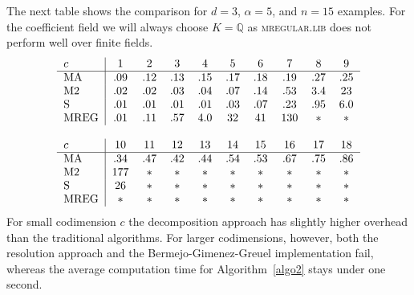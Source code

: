 \documentclass[11pt,a4paper]{amsart}%
\theoremstyle{definition}
\theoremstyle{remark}
\numberwithin{equation}{section}
\theoremstyle{plain}
\begin{document}
The next table shows the comparison for $d=3$, $\alpha=5$, and $n=15$
examples. For the coefficient field we will always choose $K=\mathbb{Q}$ as
\textsc{mregular.lib} does not perform well over finite fields.
\[%
\begin{tabular}
[c]{lccccccccc}%
$c$ & \multicolumn{1}{|c}{$1$} & $2$ & $3$ & $4$ & $5$ & $6$ & $7$ & $8$ &
$9$\\\hline
MA & \multicolumn{1}{|c}{$.09$} & $.12$ & $.13$ & $.15$ & $.17$ & $.18$ &
$.19$ & $.27$ & $.25$\\
M2 & \multicolumn{1}{|c}{$.02$} & $.02$ & $.03$ & $.04$ & $.07$ & $.14$ &
$.53$ & $3.4$ & $23$\\
S & \multicolumn{1}{|c}{$.01$} & $.01$ & $.01$ & $.01$ & $.03$ & $.07$ &
$.23$ & $.95$ & $6.0$\\
MREG & \multicolumn{1}{|c}{$.01$} & $.11$ & $.57$ & $4.0$ & $32$ & $41$ &
$130$ & $\ast$ & $\ast$\\
&  &  &  &  &  &  &  &  & \\
$c$ & \multicolumn{1}{|c}{$10$} & $11$ & $12$ & $13$ & $14$ & $15$ & $16$ &
$17$ & $18$\\\hline
MA & \multicolumn{1}{|c}{$.34$} & $.47$ & $.42$ & $.44$ & $.54$ & $.53$ &
$.67$ & $.75$ & $.86$\\
M2 & \multicolumn{1}{|c}{$177$} & $\ast$ & $\ast$ & $\ast$ & $\ast$ & $\ast$
& $\ast$ & $\ast$ & $\ast$\\
S & \multicolumn{1}{|c}{$26$} & $\ast$ & $\ast$ & $\ast$ & $\ast$ & $\ast$ &
$\ast$ & $\ast$ & $\ast$\\
MREG & \multicolumn{1}{|c}{$\ast$} & $\ast$ & $\ast$ & $\ast$ & $\ast$ &
$\ast$ & $\ast$ & $\ast$ & $\ast$%
\end{tabular}
\]
For small codimension $c$ the decomposition approach has slightly higher
overhead than the traditional algorithms. For larger codimensions, however,
both the resolution approach and the Bermejo-Gimenez-Greuel implementation
fail, whereas the average computation time for Algorithm~\ref{algo2} stays
under one second.
\end{document}
